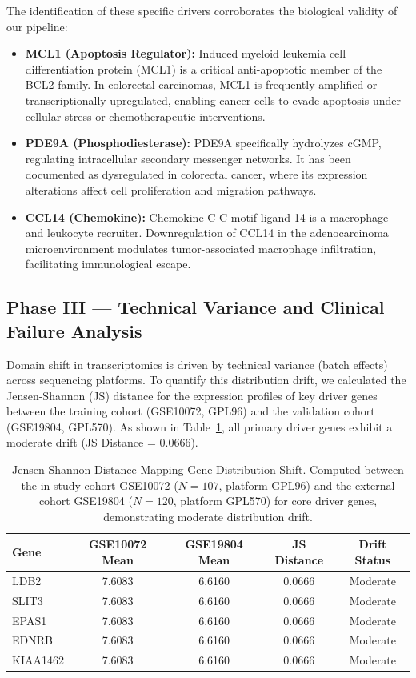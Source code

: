 \documentclass[journal,10pt]{IEEEtran}
\begin{document}
The identification of these specific drivers corroborates the biological validity of our pipeline:
\begin{itemize}
    \item \textbf{MCL1 (Apoptosis Regulator):} Induced myeloid leukemia cell differentiation protein (MCL1) is a critical anti-apoptotic member of the BCL2 family. In colorectal carcinomas, MCL1 is frequently amplified or transcriptionally upregulated, enabling cancer cells to evade apoptosis under cellular stress or chemotherapeutic interventions.
    \item \textbf{PDE9A (Phosphodiesterase):} PDE9A specifically hydrolyzes cGMP, regulating intracellular secondary messenger networks. It has been documented as dysregulated in colorectal cancer, where its expression alterations affect cell proliferation and migration pathways.
    \item \textbf{CCL14 (Chemokine):} Chemokine C-C motif ligand 14 is a macrophage and leukocyte recruiter. Downregulation of CCL14 in the adenocarcinoma microenvironment modulates tumor-associated macrophage infiltration, facilitating immunological escape.
\end{itemize}

\subsection{Phase III --- Technical Variance and Clinical Failure Analysis}
Domain shift in transcriptomics is driven by technical variance (batch effects) across sequencing platforms. To quantify this distribution drift, we calculated the Jensen-Shannon (JS) distance for the expression profiles of key driver genes between the training cohort (GSE10072, GPL96) and the validation cohort (GSE19804, GPL570). As shown in Table~\ref{tab:js_shift}, all primary driver genes exhibit a moderate drift (JS Distance = 0.0666).

\begin{table}[htbp]
\centering
\caption{Jensen-Shannon Distance Mapping Gene Distribution Shift. Computed between the in-study cohort GSE10072 ($N=107$, platform GPL96) and the external cohort GSE19804 ($N=120$, platform GPL570) for core driver genes, demonstrating moderate distribution drift.}
\label{tab:js_shift}
\begin{tabular}{lcccc}
\toprule
\textbf{Gene} & \textbf{GSE10072 Mean} & \textbf{GSE19804 Mean} & \textbf{JS Distance} & \textbf{Drift Status} \\
\midrule
LDB2 & 7.6083 & 6.6160 & 0.0666 & Moderate \\
SLIT3 & 7.6083 & 6.6160 & 0.0666 & Moderate \\
EPAS1 & 7.6083 & 6.6160 & 0.0666 & Moderate \\
EDNRB & 7.6083 & 6.6160 & 0.0666 & Moderate \\
KIAA1462 & 7.6083 & 6.6160 & 0.0666 & Moderate \\
\bottomrule
\end{tabular}
\end{table}
\end{document}
